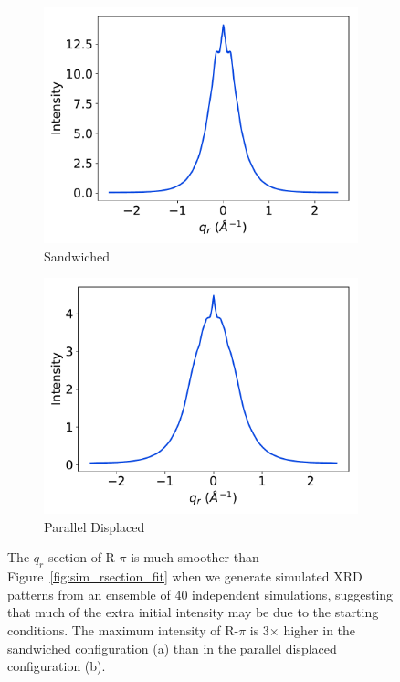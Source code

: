 \documentclass[journal=jpcbfk,manuscript=article]{achemso}
\begin{document}
  \begin{figure}[!htb]
  \centering
  \begin{subfigure}{0.45\textwidth}
  \includegraphics[width=\textwidth]{sandwiched_ensemble_rsection.pdf}
  \caption{Sandwiched}\label{fig:sandwiched_ensemble_rsection}
  \end{subfigure}
  \begin{subfigure}{0.45\textwidth}
  \includegraphics[width=\textwidth]{offset_ensemble_rsection.pdf}
  \caption{Parallel Displaced}\label{fig:offset_ensemble_rsection}
  \end{subfigure}
  \caption{The $q_r$ section of R-$\pi$ is much smoother than Figure~\ref{fig:sim_rsection_fit} when
  		   we generate simulated XRD patterns from an ensemble of 40 independent simulations,
  		   suggesting that much of the extra initial intensity may be due to the starting 
  		   conditions. The maximum intensity of R-$\pi$ is 3$\times$ higher in the sandwiched
  		   configuration (a) than in the parallel displaced configuration (b).}\label{fig:ensemble_XRD}
  \end{figure}
 
\end{document}

